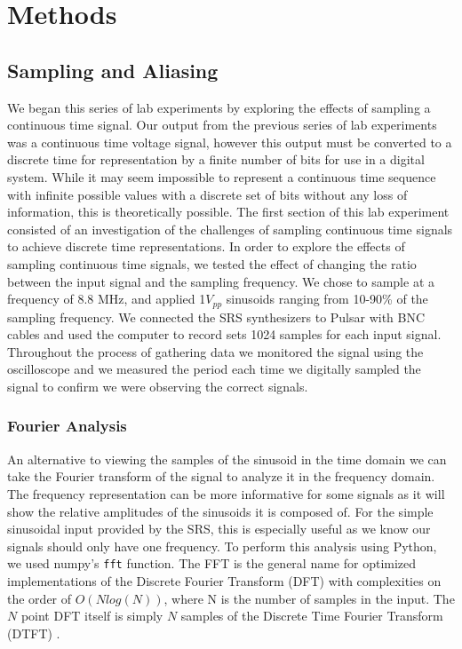 \documentclass{article}
\begin{document}

\section{Methods}
  \subsection{Sampling and Aliasing}
  We began this series of lab experiments by exploring the effects of sampling a continuous time signal. Our output from the previous series of lab experiments was a continuous time voltage signal, however this output must be converted to a discrete time for representation by a finite number of bits for use in a digital system. While it may seem impossible to represent a continuous time sequence with infinite possible values with a discrete set of bits without any loss of information, this is theoretically possible.  The first section of this lab experiment consisted of an investigation of the challenges of sampling continuous time signals to achieve discrete time representations.  
  In order to explore the effects of sampling continuous time signals, we tested the effect of changing the ratio between the input signal and the sampling frequency.  We chose to sample at a frequency of 8.8 MHz, and applied 1$V_{pp}$ sinusoids ranging from 10-90\% of the sampling frequency. We connected the SRS synthesizers to Pulsar with BNC cables and used the computer to record sets 1024 samples for each input signal.  Throughout the process of gathering data we monitored the signal using the oscilloscope and we measured the period each time we digitally sampled the signal to confirm we were observing the correct signals. 
  \subsubsection{Fourier Analysis}
  An alternative to viewing the samples of the sinusoid in the time domain we can take the Fourier transform of the signal to analyze it in the frequency domain. The frequency representation can be more informative for some signals as it will show the relative amplitudes of the sinusoids it is composed of.  For the simple sinusoidal input provided by the SRS, this is especially useful as we know our signals should only have one frequency.
  To perform this analysis using Python, we used numpy's \lstinline{fft} function.  The FFT is the general name for optimized implementations of the Discrete Fourier Transform (DFT) with complexities on the order of $O(Nlog(N))$, where N is the number of samples in the input. The $N$ point DFT itself is simply $N$ samples of the Discrete Time Fourier Transform (DTFT) \citep{oppenheim}.
    
\end{document}
